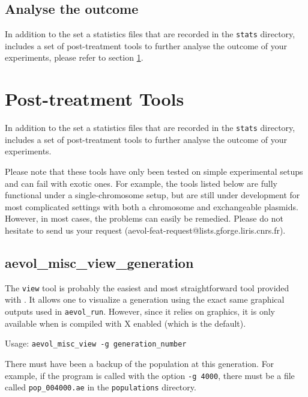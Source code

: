 \subsection{Analyse the outcome}

In addition to the set a statistics files that are recorded in the \verb?stats? directory, \aevol{} includes a set of post-treatment tools to further analyse the outcome of your experiments, please refer to section \ref{sect:post-treatments}.


\section{Post-treatment Tools}
\label{sect:post-treatments}

In addition to the set a statistics files that are recorded in the \verb?stats? directory, \aevol{} includes a set of post-treatment tools to further analyse the outcome of your experiments.

Please note that these tools have only been tested on simple experimental setups and can fail with exotic ones. For example, the tools listed below are fully functional under a single-chromosome setup, but are still under development for most complicated settings with both a chromosome and exchangeable plasmids. However, in most cases, the problems can easily be remedied. Please do not hesitate to send us your request (aevol-feat-request@lists.gforge.liris.cnrs.fr).


\subsection{aevol\_misc\_view\_generation}
\label{sect:view-gener}
The \verb?view? tool is probably the easiest and most straightforward tool provided with \aevol{}.
It allows one to visualize a generation using the exact same graphical outputs used in \verb?aevol_run?.
However, since it relies on graphics, it is only available when \aevol{} is compiled with X enabled (which is the default).

Usage: \verb?aevol_misc_view -g generation_number?

There must have been a backup of the population at this generation. For example, if the program is called with the option
\verb?-g 4000?, there must be a file called \verb?pop_004000.ae? in the \verb?populations? directory.


